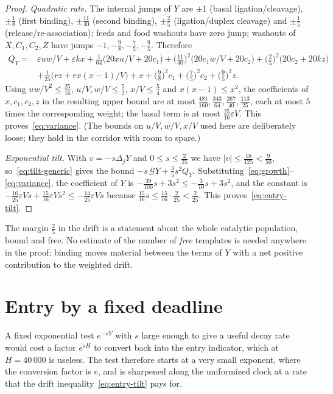 \documentclass[11pt,a4paper]{article}
\theoremstyle{plain}
\theoremstyle{definition}
\theoremstyle{remark}
\newcommand{\G}{\mathcal G}
\newcommand{\eps}{\varepsilon}
\begin{document}
\begin{proof}
\emph{Quadratic rate.} The internal jumps of $Y$ are $\pm1$ (basal ligation/cleavage), $\pm\frac18$ (first binding), $\pm\frac{11}{40}$ (second binding), $\pm\frac25$ (ligation/duplex cleavage) and $\pm\frac15$ (release/re-association); feeds and food washouts have zero jump; washouts of $X,C_1,C_2,Z$ have jumps $-1,-\frac98,-\frac75,-\frac95$. Therefore
\begin{align*}
Q_Y={}&\eps uw/V+\eps kx+\tfrac1{64}\bigl(20xu/V+20c_1\bigr)+\bigl(\tfrac{11}{40}\bigr)^2\bigl(20c_1w/V+20c_2\bigr)+\bigl(\tfrac25\bigr)^2\bigl(20c_2+20kz\bigr)\\
&+\tfrac1{25}\bigl(rz+rx(x-1)/V\bigr)+x+\bigl(\tfrac98\bigr)^2c_1+\bigl(\tfrac75\bigr)^2c_2+\bigl(\tfrac95\bigr)^2z .
\end{align*}
Using $uw/V^2\le\frac{25}{16}$, $u/V,w/V\le\frac52$, $x/V\le\frac54$ and $x(x-1)\le x^2$, the coefficients of $x,c_1,c_2,z$ in the resulting upper bound are at most $\frac{481}{160},\frac{343}{64},\frac{267}{40},\frac{113}{25}$, each at most $5$ times the corresponding weight; the basal term is at most $\frac{25}{16}\eps V$. This proves~\eqref{eq:variance}. (The bounds on $u/V,w/V,x/V$ used here are deliberately loose; they hold in the corridor with room to spare.)

\emph{Exponential tilt.} With $v=-s\Delta_jY$ and $0\le s\le\frac2{25}$ we have $|v|\le\frac{18}{125}<\frac9{50}$, so~\eqref{eq:tilt-generic} gives the bound $-s\,\G Y+\frac35s^2Q_Y$. Substituting~\eqref{eq:growth}--\eqref{eq:variance}, the coefficient of $Y$ is $-\frac{39}{100}s+3s^2\le-\frac3{10}s+3s^2$, and the constant is $-\frac{16}{25}\eps Vs+\frac{15}{16}\eps Vs^2\le-\frac{14}{25}\eps Vs$ because $\frac{15}{16}s\le\frac{15}{16}\cdot\frac2{25}<\frac2{25}$. This proves~\eqref{eq:entry-tilt}.
\end{proof}

The margin $\frac25$ in the drift is a statement about the whole catalytic population, bound and free. No estimate of the number of \emph{free} templates is needed anywhere in the proof: binding moves material between the terms of $Y$ with a net positive contribution to the weighted drift.

\section{Entry by a fixed deadline}\label{sec:entry}

A fixed exponential test $e^{-sY}$ with $s$ large enough to give a useful decay rate would cost a factor $e^{sH}$ to convert back into the entry indicator, which at $H=40\,000$ is useless. The test therefore starts at a very small exponent, where the conversion factor is $e$, and is sharpened along the uniformized clock at a rate that the drift inequality~\eqref{eq:entry-tilt} pays for.
\end{document}
